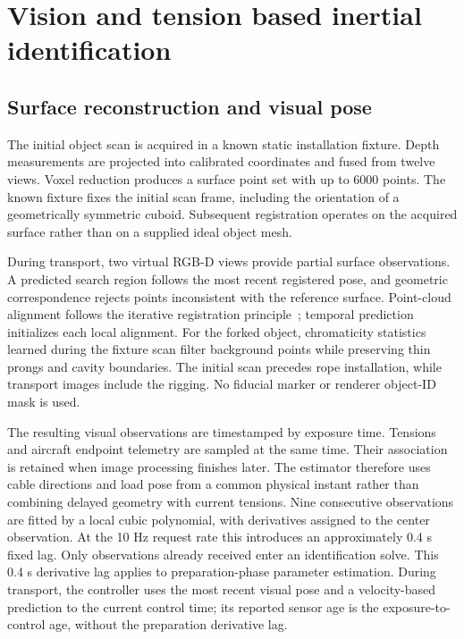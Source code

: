 \section{Vision and tension based inertial identification}
\label{sec:identification}
\subsection{Surface reconstruction and visual pose}
The initial object scan is acquired in a known static installation fixture. Depth measurements are projected into calibrated coordinates and fused from twelve views. Voxel reduction produces a surface point set with up to 6000 points. The known fixture fixes the initial scan frame, including the orientation of a geometrically symmetric cuboid. Subsequent registration operates on the acquired surface rather than on a supplied ideal object mesh.

During transport, two virtual RGB-D views provide partial surface observations. A predicted search region follows the most recent registered pose, and geometric correspondence rejects points inconsistent with the reference surface. Point-cloud alignment follows the iterative registration principle~\cite{icp1992}; temporal prediction initializes each local alignment. For the forked object, chromaticity statistics learned during the fixture scan filter background points while preserving thin prongs and cavity boundaries. The initial scan precedes rope installation, while transport images include the rigging. No fiducial marker or renderer object-ID mask is used.

The resulting visual observations are timestamped by exposure time. Tensions and aircraft endpoint telemetry are sampled at the same time. Their association is retained when image processing finishes later. The estimator therefore uses cable directions and load pose from a common physical instant rather than combining delayed geometry with current tensions. Nine consecutive observations are fitted by a local cubic polynomial, with derivatives assigned to the center observation. At the 10 Hz request rate this introduces an approximately 0.4 s fixed lag. Only observations already received enter an identification solve. This 0.4 s derivative lag applies to preparation-phase parameter estimation. During transport, the controller uses the most recent visual pose and a velocity-based prediction to the current control time; its reported sensor age is the exposure-to-control age, without the preparation derivative lag.

